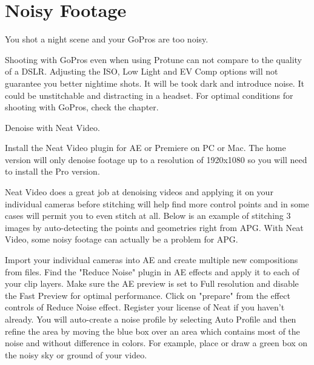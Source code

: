 \section{Noisy Footage}
\pagecolor{white}
\label{chap:55}
\begin{fullwidth}

\problem

{\large You shot a night scene and your GoPros are too noisy. \par}

Shooting with GoPros even when using Protune can not compare to the quality of a DSLR. Adjusting the ISO, Low Light and EV Comp options will not guarantee you better nightime shots. It will be took dark and introduce noise. It could be unstitchable and distracting in a headset. For optimal conditions for shooting with GoPros, check the \textbf{} chapter.

\solutions

{\large Denoise with Neat Video. \par}

Install the Neat Video plugin for AE or Premiere on PC or Mac. The home version will only denoise footage up to a resolution of 1920x1080 so you will need to install the Pro version. 

Neat Video does a great job at denoising videos and applying it on your individual cameras before stitching will help find more control points and in some cases will permit you to even stitch at all. Below is an example of stitching 3 images by auto-detecting the points and geometries right from APG. With Neat Video, some noisy footage can actually be a problem for APG.


Import your individual cameras into AE and create multiple new compositions from files. Find the "Reduce Noise" plugin in AE effects and apply it to each of your clip layers. Make sure the AE preview is set to Full resolution and disable the Fast Preview for optimal performance. Click on "prepare" from the effect controls of Reduce Noise effect. Register your license of Neat if you haven't already. You will auto-create a noise profile by selecting Auto Profile and then refine the area by moving the blue box over an area which contains most of the noise and without difference in colors. For example, place or draw a green box on the noisy sky or ground of your video.  



\end{fullwidth}
